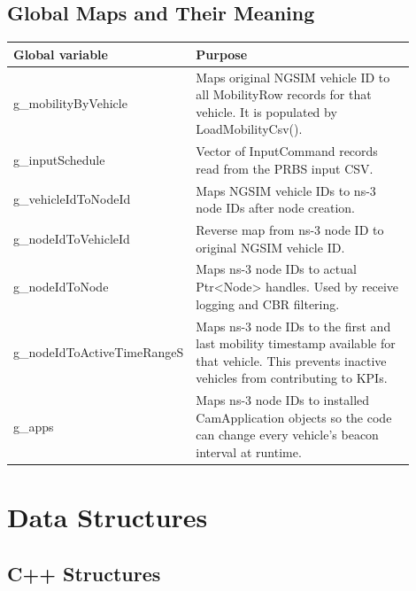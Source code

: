 \documentclass[11pt]{article}
\DeclareRobustCommand{\code}[1]{\texttt{\detokenize{#1}}}
\def\code#1{#1}%
\begin{document}
\subsection{Global Maps and Their Meaning}

\begin{center}
\begin{longtable}{L{0.34\linewidth}L{0.56\linewidth}}
\toprule
Global variable & Purpose \\
\midrule
\endhead
\code{g_mobilityByVehicle} &
Maps original NGSIM vehicle ID to all \code{MobilityRow} records for that
vehicle.  It is populated by \code{LoadMobilityCsv()}. \\
\code{g_inputSchedule} &
Vector of \code{InputCommand} records read from the PRBS input CSV. \\
\code{g_vehicleIdToNodeId} &
Maps NGSIM vehicle IDs to ns-3 node IDs after node creation. \\
\code{g_nodeIdToVehicleId} &
Reverse map from ns-3 node ID to original NGSIM vehicle ID. \\
\code{g_nodeIdToNode} &
Maps ns-3 node IDs to actual \code{Ptr<Node>} handles.  Used by receive logging
and CBR filtering. \\
\code{g_nodeIdToActiveTimeRangeS} &
Maps ns-3 node IDs to the first and last mobility timestamp available for that
vehicle.  This prevents inactive vehicles from contributing to KPIs. \\
\code{g_apps} &
Maps ns-3 node IDs to installed \code{CamApplication} objects so the code can
change every vehicle's beacon interval at runtime. \\
\bottomrule
\end{longtable}
\end{center}

\section{Data Structures}

\subsection{C++ Structures}
\end{document}
